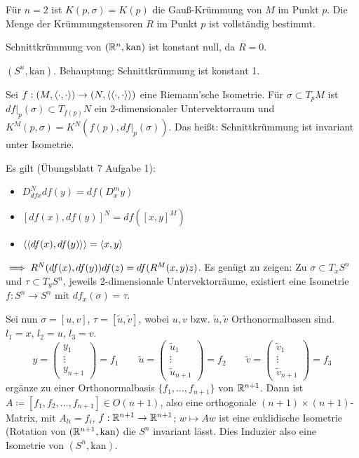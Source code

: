 \documentclass[a4paper,twoside,DIV15,BCOR12mm]{scrbook}
\renewcommand{\da}{\coloneqq}
\newcommand{\kan}{\text{kan}}
\begin{document}
\begin{bemerkungen}
\item Für $n=2$ ist $K(p,\sigma) = K(p)$ die Gauß-Krümmung von $M$ im Punkt $p$. Die Menge der Krümmungstensoren $R$ im Punkt $p$ ist vollständig bestimmt.
\begin{beispiel}
Schnittkrümmung von $(\MdR^n,\kan)$ ist konstant null, da $R=0$.
\end{beispiel}
\item $(S^n,\kan)$. Behauptung: Schnittkrümmung ist konstant 1.
\begin{lemma}
Sei $f:(M,\langle\cdot,\cdot\rangle) \to (N,\langle\langle\cdot,\cdot\rangle\rangle)$ eine Riemann’sche Isometrie. Für $\sigma \subset T_pM$ ist $df|_p(\sigma) \subset T_{f(p)}N$ ein 2-dimensionaler Untervektorraum und $K^M(p,\sigma) = K^N(f(p),df|_p(\sigma))$. Das heißt: Schnittkrümmung ist invariant unter Isometrie.
\end{lemma}
\begin{beweis}
Es gilt (Übungsblatt 7 Aufgabe 1):
\begin{itemize}
\item $D_{dfx}^N df(y) = df(D_x^my)$
\item $[df(x), df(y)]^N = df([x,y]^M)$
\item $\langle\langle df(x),df(y)\rangle\rangle = \langle x,y\rangle$
\end{itemize}
$\implies R^N(df(x), df(y)) df(z) = df(R^M(x,y)z)$. Es genügt zu zeigen: Zu $\sigma \subset T_xS^n$ und $\tau \subset T_yS^n$, jeweils 2-dimensionale Untervektorräume, existiert eine Isometrie $f: S^n \to S^n$ mit $df_x(\sigma) = \tau$.

Sei nun $\sigma = [u,v]$, $\tau = [\tilde u, \tilde v]$, wobei $u,v$ bzw. $\tilde u, \tilde v$ Orthonormalbasen sind. $l_1=x$, $l_2=u$, $l_3=v$.
\[
y =
\begin{pmatrix}
y_1 \\ \vdots \\ y_{n+1}
\end{pmatrix}
= f_1
\qquad
\tilde u =
\begin{pmatrix}
\tilde u_1 \\ \vdots \\ \tilde u_{n+1}
\end{pmatrix}
= f_2
\qquad
\tilde v =
\begin{pmatrix}
\tilde v_1 \\ \vdots \\ \tilde v_{n+1}
\end{pmatrix}
= f_3
\]
ergänze zu einer Orthonormalbasis $\{f_1,\ldots,f_{n+1}\}$ von $\mathbb{R}^{n+1}$. Dann ist $A \da [f_1,f_2,\ldots,f_{n+1}] \in O(n+1)$, also eine orthogonale $(n+1)\times(n+1)$-Matrix, mit $A_{li} = f_i$, $f: \mathbb{R}^{n+1} \to \mathbb{R}^{n+1}$; $w\mapsto Aw$ ist eine euklidische Isometrie (Rotation von $(\MdR^{n+1},\kan)$ die $S^n$ invariant lässt. Dies Induzier also eine Isometrie von $(S^n,\kan)$.


\end{beweis}
\end{bemerkungen}
\end{document}
